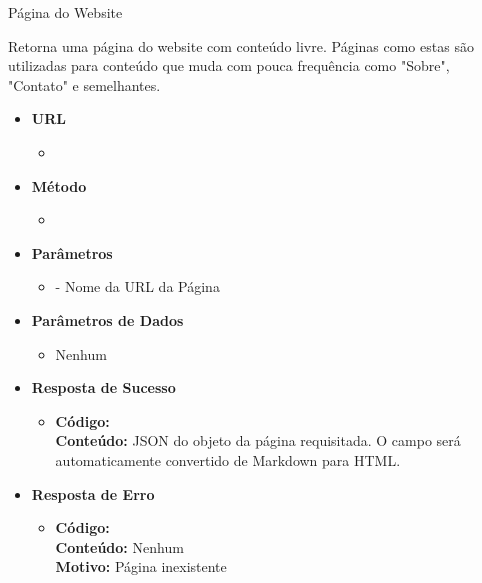 
\begin{caixa}{Página do Website}{}

Retorna uma página do website com conteúdo livre. Páginas como estas são utilizadas para conteúdo que muda com pouca frequência como "Sobre", "Contato" e semelhantes.

\begin{itemize}
\item \textbf{URL}
	\begin{itemize}
		\item {}
	\end{itemize}

\item \textbf{Método}
	\begin{itemize}
		\item {}
	\end{itemize}

\item \textbf{Parâmetros}
	\begin{itemize}
        \item {} - Nome da URL da Página
	\end{itemize}

\item \textbf{Parâmetros de Dados}
	\begin{itemize}
		\item Nenhum
	\end{itemize}

\item \textbf{Resposta de Sucesso}
	\begin{itemize}
		\item \textbf{Código:}  \\ \textbf{Conteúdo:} JSON do objeto  da página requisitada. O campo  será automaticamente convertido de Markdown para HTML.
	\end{itemize}

\item \textbf{Resposta de Erro}
	\begin{itemize}
		\item \textbf{Código:}  \\ \textbf{Conteúdo:} Nenhum \\ \textbf{Motivo:} Página inexistente
	\end{itemize}

\end{itemize}
\end{caixa}







